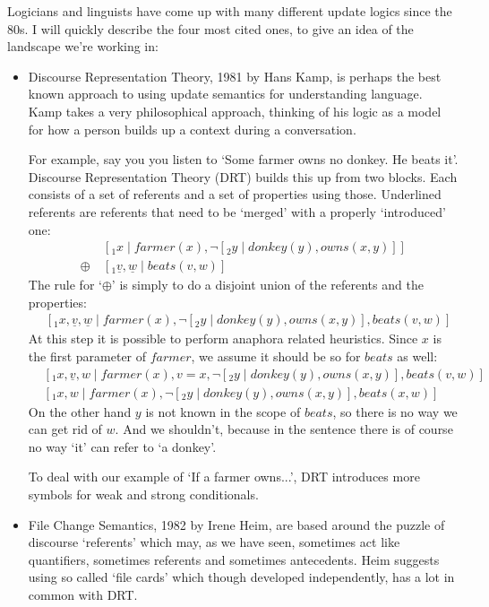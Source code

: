 \documentclass[12pt]{article}
\begin{document}
Logicians and linguists have come up with many different update logics since the 80s. I will quickly describe the four most cited ones, to give an idea of the landscape we're working in:
%
\begin{itemize}
\item Discourse Representation Theory, 1981 by Hans Kamp\cite{kamp1981theory}, is perhaps the best known approach to using update semantics for understanding language. Kamp takes a very philosophical approach, thinking of his logic as a model for how a person builds up a context during a conversation.

For example, say you you listen to `Some farmer owns no donkey. He beats it'. Discourse Representation Theory (DRT) builds this up from two blocks. Each consists of a set of referents and a set of properties using those. Underlined referents are referents that need to be `merged' with a properly `introduced' one:
%
\begin{align}
&[_1 x\mid farmer(x), \neg[_2 y\mid donkey(y), owns(x,y)] ] \nonumber\\
\oplus\ & [_1 \underline{v}, \underline{w}\mid beats(v,w) ] \nonumber
\end{align}
%
The rule for `$\oplus$' is simply to do a disjoint union of the referents and the properties:
%
\begin{align}
&[_1 x, \underline{v}, \underline{w}\mid farmer(x), \neg[_2 y\mid donkey(y), owns(x,y)], beats(v,w) ] \nonumber
\end{align}
%
At this step it is possible to perform anaphora related heuristics. Since $x$ is the first parameter of $farmer$, we assume it should be so for $beats$ as well:
%
\begin{align}
&[_1 x, \underline{v}, w\mid farmer(x), v=x, \neg[_2 y\mid donkey(y), owns(x,y)], beats(v,w) ] \nonumber\\
&[_1 x, w\mid farmer(x), \neg[_2 y\mid donkey(y), owns(x,y)], beats(x,w) ]\nonumber
\end{align}
%
On the other hand $y$ is not known in the scope of $beats$, so there is no way we can get rid of $w$. And we shouldn't, because in the sentence there is of course no way `it' can refer to `a donkey'.

To deal with our example of `If a farmer owns...', DRT introduces more symbols for weak and strong conditionals.

\item File Change Semantics, 1982 by Irene Heim\cite{heim1983file}, are based around the puzzle of discourse `referents' which may, as we have seen, sometimes act like quantifiers, sometimes referents and sometimes antecedents. Heim suggests using so called `file cards' which though developed independently, has a lot in common with DRT.


\end{itemize}
\end{document}
